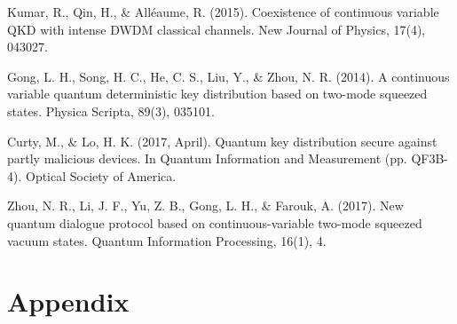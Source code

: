 \documentclass[smallextended]{svjour3}
\begin{document}
\begin{thebibliography}{99}
 Kumar, R., Qin, H., \& Alléaume, R. (2015). Coexistence of continuous variable QKD with intense DWDM classical channels. New Journal of Physics, 17(4), 043027.


 Gong, L. H., Song, H. C., He, C. S., Liu, Y., \& Zhou, N. R. (2014). A continuous variable quantum deterministic key distribution based on two-mode squeezed states. Physica Scripta, 89(3), 035101.

 Curty, M., \& Lo, H. K. (2017, April). Quantum key distribution secure against partly malicious devices. In Quantum Information and Measurement (pp. QF3B-4). Optical Society of America.

 Zhou, N. R., Li, J. F., Yu, Z. B., Gong, L. H., \& Farouk, A. (2017). New quantum dialogue protocol based on continuous-variable two-mode squeezed vacuum states. Quantum Information Processing, 16(1), 4.

\end{thebibliography}
\clearpage
\appendix
\section*{Appendix}
\end{document}
